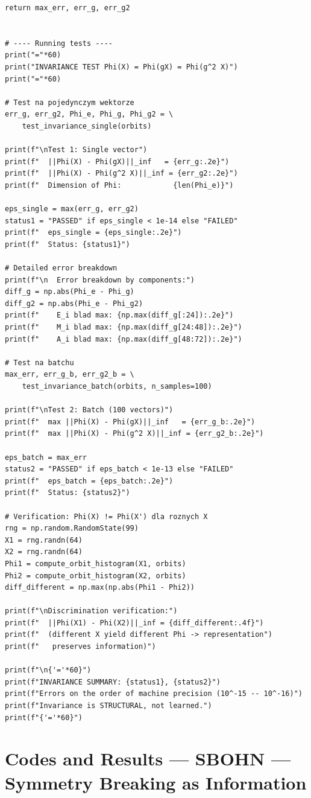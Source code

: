 \documentclass[11pt,a4paper]{report}
\begin{document}
\begin{lstlisting}[caption={Orbit histogram invariance test}]
    return max_err, err_g, err_g2


# ---- Running tests ----
print("="*60)
print("INVARIANCE TEST Phi(X) = Phi(gX) = Phi(g^2 X)")
print("="*60)

# Test na pojedynczym wektorze
err_g, err_g2, Phi_e, Phi_g, Phi_g2 = \
    test_invariance_single(orbits)

print(f"\nTest 1: Single vector")
print(f"  ||Phi(X) - Phi(gX)||_inf   = {err_g:.2e}")
print(f"  ||Phi(X) - Phi(g^2 X)||_inf = {err_g2:.2e}")
print(f"  Dimension of Phi:            {len(Phi_e)}")

eps_single = max(err_g, err_g2)
status1 = "PASSED" if eps_single < 1e-14 else "FAILED"
print(f"  eps_single = {eps_single:.2e}")
print(f"  Status: {status1}")

# Detailed error breakdown
print(f"\n  Error breakdown by components:")
diff_g = np.abs(Phi_e - Phi_g)
diff_g2 = np.abs(Phi_e - Phi_g2)
print(f"    E_i blad max: {np.max(diff_g[:24]):.2e}")
print(f"    M_i blad max: {np.max(diff_g[24:48]):.2e}")
print(f"    A_i blad max: {np.max(diff_g[48:72]):.2e}")

# Test na batchu
max_err, err_g_b, err_g2_b = \
    test_invariance_batch(orbits, n_samples=100)

print(f"\nTest 2: Batch (100 vectors)")
print(f"  max ||Phi(X) - Phi(gX)||_inf   = {err_g_b:.2e}")
print(f"  max ||Phi(X) - Phi(g^2 X)||_inf = {err_g2_b:.2e}")

eps_batch = max_err
status2 = "PASSED" if eps_batch < 1e-13 else "FAILED"
print(f"  eps_batch = {eps_batch:.2e}")
print(f"  Status: {status2}")

# Verification: Phi(X) != Phi(X') dla roznych X
rng = np.random.RandomState(99)
X1 = rng.randn(64)
X2 = rng.randn(64)
Phi1 = compute_orbit_histogram(X1, orbits)
Phi2 = compute_orbit_histogram(X2, orbits)
diff_different = np.max(np.abs(Phi1 - Phi2))

print(f"\nDiscrimination verification:")
print(f"  ||Phi(X1) - Phi(X2)||_inf = {diff_different:.4f}")
print(f"  (different X yield different Phi -> representation")
print(f"   preserves information)")

print(f"\n{'='*60}")
print(f"INVARIANCE SUMMARY: {status1}, {status2}")
print(f"Errors on the order of machine precision (10^-15 -- 10^-16)")
print(f"Invariance is STRUCTURAL, not learned.")
print(f"{'='*60}")
\end{lstlisting}

\section{Codes and Results --- SBOHN --- Symmetry Breaking as Information}
\end{document}
